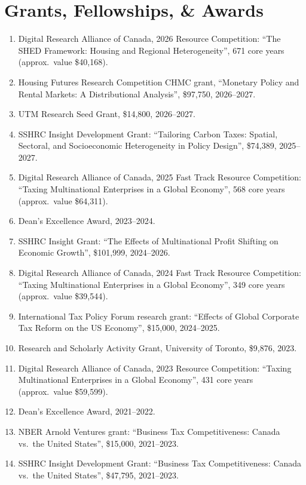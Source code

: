 \documentclass[letterpaper]{article}
\begin{document}
\section*{Grants, Fellowships, \& Awards}
\begin{enumerate}
\item Digital Research Alliance of Canada, 2026 Resource Competition: ``The SHED Framework: Housing and Regional Heterogeneity'', 671 core years (approx.\ value \$40,168).
\item Housing Futures Research Competition CHMC grant, ``Monetary Policy and Rental Markets: A Distributional Analysis'', \$97,750, 2026--2027.
\item UTM Research Seed Grant, \$14,800, 2026--2027.
\item SSHRC Insight Development Grant: ``Tailoring Carbon Taxes: Spatial, Sectoral, and Socioeconomic Heterogeneity in Policy Design'', \$74,389, 2025--2027.
\item Digital Research Alliance of Canada, 2025 Fast Track Resource Competition: ``Taxing Multinational Enterprises in a Global Economy'', 568 core years (approx.\ value \$64,311).
\item Dean's Excellence Award, 2023--2024.
\item SSHRC Insight Grant: ``The Effects of Multinational Profit Shifting on Economic Growth'', \$101,999, 2024--2026.
\item Digital Research Alliance of Canada, 2024 Fast Track Resource Competition: ``Taxing Multinational Enterprises in a Global Economy'', 349 core years (approx.\ value \$39,544).
\item International Tax Policy Forum research grant: ``Effects of Global Corporate Tax Reform on the US Economy'', \$15,000, 2024--2025.
\item Research and Scholarly Activity Grant, University of Toronto, \$9,876, 2023.
\item Digital Research Alliance of Canada, 2023 Resource Competition: ``Taxing Multinational Enterprises in a Global Economy'', 431 core years (approx.\ value \$59,599).
\item Dean's Excellence Award, 2021--2022.
\item NBER Arnold Ventures grant: ``Business Tax Competitiveness: Canada vs.\ the United States'', \$15,000, 2021--2023.
\item SSHRC Insight Development Grant: ``Business Tax Competitiveness: Canada vs.\ the United States'', \$47,795, 2021--2023.

\end{enumerate}
\end{document}
